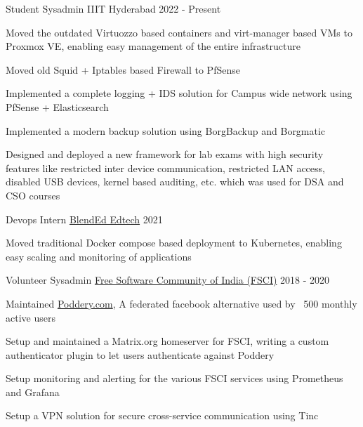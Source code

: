 
\begin{cventries}
  \cventry
    {Student Sysadmin} %
    {IIIT Hyderabad} %
    {} %
    {2022 - Present} %
    {
      \begin{cvitems} %
        \item {Moved the outdated Virtuozzo based containers and virt-manager based VMs to Proxmox VE, enabling easy management of the entire infrastructure}
        \item {Moved old Squid + Iptables based Firewall to PfSense}
        \item {Implemented a complete logging + IDS solution for Campus wide network using PfSense + Elasticsearch}
        \item {Implemented a modern backup solution using BorgBackup and Borgmatic}
        \item {Designed and deployed a new framework for lab exams with high security features like restricted inter device communication, restricted LAN access, disabled USB devices, kernel based auditing, etc. which was used for DSA and CSO courses}
      \end{cvitems}
    }

  \cventry
    {Devops Intern} %
    {\href{https://blend-ed.org/}{BlendEd Edtech}} %
    {} %
    {2021} %
    {
      \begin{cvitems} %
        \item {Moved traditional Docker compose based deployment to Kubernetes, enabling easy scaling and monitoring of applications}
      \end{cvitems}
    }

    \cventry
    {Volunteer Sysadmin} %
    {\href{https://fsci.in}{Free Software Community of India (FSCI)}} %
    {} %
    {2018 - 2020} %
    {
      \begin{cvitems} %
        \item {Maintained \href{https://poddery.com}{Poddery.com}, A federated facebook alternative used by ~500 monthly active users}
        \item {Setup and maintained a Matrix.org homeserver for FSCI, writing a custom authenticator plugin to let users authenticate against Poddery}
        \item {Setup monitoring and alerting for the various FSCI services using Prometheus and Grafana}
        \item {Setup a VPN solution for secure cross-service communication using Tinc}
      \end{cvitems}
    }
\end{cventries}
